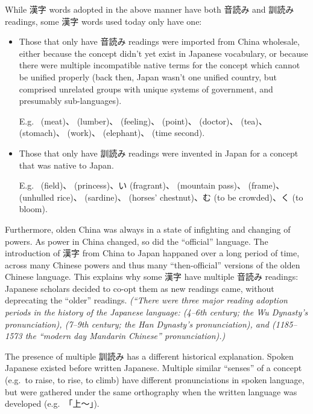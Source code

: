 \documentclass[../nihongo-gakushuu-kyouzai.tex]{subfiles}
\begin{document}
While 漢字 words adopted in the above manner have both 音読み and 訓読み readings, some 漢字 words used today only have one:
\begin{itemize}
    \item Those that only have 音読み readings were imported from China wholesale, either because the concept didn't yet exist in Japanese vocabulary, or because there were multiple incompatible native terms for the concept which cannot be unified properly (back then, Japan wasn't one unified country, but comprised unrelated groups with unique systems of government, and presumably sub-languages).

    E.g.\  (meat)、 (lumber)、 (feeling)、 (point)、 (doctor)、 (tea)、 (stomach)、 (work)、 (elephant)、 (time second).
    \item Those that only have 訓読み readings were invented in Japan for a concept that was native to Japan.

    E.g.\  (field)、 (princess)、い (fragrant)、 (mountain pass)、 (frame)、 (unhulled rice)、 (sardine)、 (horses' chestnut)、む (to be crowded)、く (to bloom).
\end{itemize}

Furthermore, olden China was always in a state of infighting and changing of powers. As power in China changed, so did the ``official'' language. The introduction of 漢字 from China to Japan happaned over a long period of time, across many Chinese powers and thus many ``then-official'' versions of the olden Chinese language. This explains why some 漢字 have multiple 音読み readings: Japanese scholars decided to co-opt them as new readings came, without deprecating the ``older'' readings. \emph{(``There were three major reading adoption periods in the history of the Japanese language:  (4--6th century; the Wu Dynasty's pronunciation),  (7--9th century; the Han Dynasty's pronunciation), and  (1185--1573 the ``modern day Mandarin Chinese'' pronunciation).)}

The presence of multiple 訓読み has a different historical explanation. Spoken Japanese existed before written Japanese. Multiple similar ``senses'' of a concept (e.g.\ to raise, to rise, to climb) have different pronunciations in spoken language, but were gathered under the same orthography when the written language was developed (e.g.\ 「上〜」).
\end{document}
